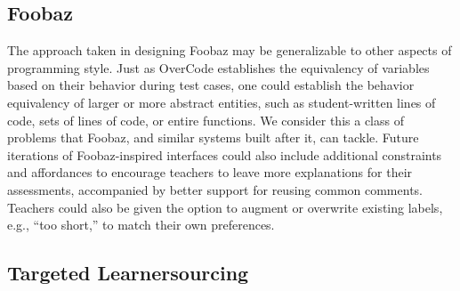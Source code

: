 \documentclass[12pt,twoside]{mitthesis}
\providecommand{\DIFaddbegin}{} %
\providecommand{\DIFaddend}{} %
\providecommand{\DIFdelbegin}{} %
\providecommand{\DIFdelend}{} %
\begin{document}
{{{{{{{{{{\subsection{Foobaz}

The approach taken in designing Foobaz may be generalizable to other aspects of programming style. Just as OverCode establishes the equivalency of variables based on their behavior during test cases, one could establish the behavior equivalency of larger or more abstract entities, such as student-written lines of code, sets of lines of code, or entire functions. We consider this a class of problems that Foobaz, and similar systems built after it, can tackle. Future iterations of Foobaz-inspired interfaces could also include additional constraints and affordances to encourage teachers to leave more explanations for their assessments, accompanied by better support for reusing common comments. Teachers could also be given the option to augment or overwrite existing labels, e.g., ``too short,'' to match their own preferences. %

\DIFdelbegin %
\DIFdelend \DIFaddbegin \subsection{Targeted Learnersourcing}
\DIFaddend 

}}}}}}}}}}
\end{document}
